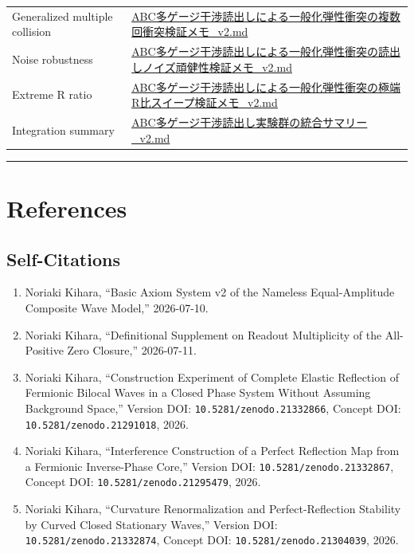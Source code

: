 \documentclass[
  a4paper,
]{article}
\providecommand{\tightlist}{%
  \setlength{\itemsep}{0pt}\setlength{\parskip}{0pt}}
\begin{document}
{\begin{longtable}[]{@{}
  >{\raggedright\arraybackslash}p{}
  >{\raggedright\arraybackslash}p{}@{}}
Generalized multiple collision &
\href{ABC多ゲージ干渉読出しによる一般化弾性衝突の複数回衝突検証メモ_v2.md}{ABC多ゲージ干渉読出しによる一般化弾性衝突の複数回衝突検証メモ\_v2.md} \\
Noise robustness &
\href{ABC多ゲージ干渉読出しによる一般化弾性衝突の読出しノイズ頑健性検証メモ_v2.md}{ABC多ゲージ干渉読出しによる一般化弾性衝突の読出しノイズ頑健性検証メモ\_v2.md} \\
Extreme R ratio &
\href{ABC多ゲージ干渉読出しによる一般化弾性衝突の極端R比スイープ検証メモ_v2.md}{ABC多ゲージ干渉読出しによる一般化弾性衝突の極端R比スイープ検証メモ\_v2.md} \\
Integration summary &
\href{ABC多ゲージ干渉読出し実験群の統合サマリー_v2.md}{ABC多ゲージ干渉読出し実験群の統合サマリー\_v2.md} \\
\end{longtable}
}

\begin{center}\rule{0.5\linewidth}{0.5pt}\end{center}

\section{References}\label{references}

\subsection{Self-Citations}\label{self-citations}

\begin{enumerate}
\def\labelenumi{\arabic{enumi}.}
\tightlist
\item
  Noriaki Kihara, ``Basic Axiom System v2 of the Nameless
  Equal-Amplitude Composite Wave Model,'' 2026-07-10.
\item
  Noriaki Kihara, ``Definitional Supplement on Readout Multiplicity of
  the All-Positive Zero Closure,'' 2026-07-11.
\item
  Noriaki Kihara, ``Construction Experiment of Complete Elastic
  Reflection of Fermionic Bilocal Waves in a Closed Phase System Without
  Assuming Background Space,'' Version DOI:
  \texttt{10.5281/zenodo.21332866}, Concept DOI:
  \texttt{10.5281/zenodo.21291018}, 2026.
\item
  Noriaki Kihara, ``Interference Construction of a Perfect Reflection
  Map from a Fermionic Inverse-Phase Core,'' Version DOI:
  \texttt{10.5281/zenodo.21332867}, Concept DOI:
  \texttt{10.5281/zenodo.21295479}, 2026.
\item
  Noriaki Kihara, ``Curvature Renormalization and Perfect-Reflection
  Stability by Curved Closed Stationary Waves,'' Version DOI:
  \texttt{10.5281/zenodo.21332874}, Concept DOI:
  \texttt{10.5281/zenodo.21304039}, 2026.
\end{enumerate}
\end{document}
